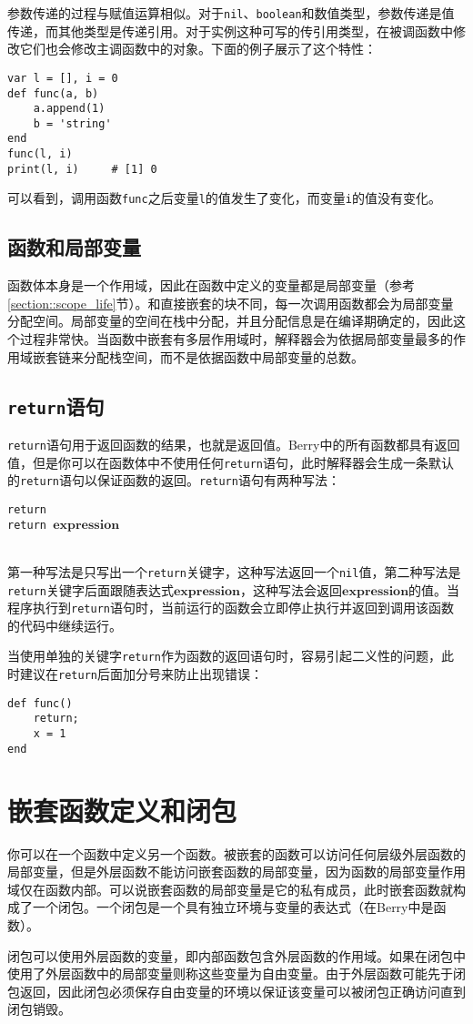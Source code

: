 参数传递的过程与赋值运算相似。对于\texttt{nil}、\texttt{boolean}和数值类型，参数传递是值传递，而其他类型是传递引用。对于实例这种可写的传引用类型，在被调函数中修改它们也会修改主调函数中的对象。下面的例子展示了这个特性：
\begin{lstlisting}[language=berry]
var l = [], i = 0
def func(a, b)
    a.append(1)
    b = 'string'
end
func(l, i)
print(l, i)     # [1] 0
\end{lstlisting}
可以看到，调用函数\texttt{func}之后变量\texttt{l}的值发生了变化，而变量\texttt{i}的值没有变化。

\subsection{函数和局部变量}

函数体本身是一个作用域，因此在函数中定义的变量都是局部变量（参考\ref{section::scope_life}节）。和直接嵌套的块不同，每一次调用函数都会为局部变量分配空间。局部变量的空间在栈中分配，并且分配信息是在编译期确定的，因此这个过程非常快。当函数中嵌套有多层作用域时，解释器会为依据局部变量最多的作用域嵌套链来分配栈空间，而不是依据函数中局部变量的总数。

\subsection{\texttt{return}语句}

\texttt{return}语句用于返回函数的结果，也就是返回值。Berry中的所有函数都具有返回值，但是你可以在函数体中不使用任何\texttt{return}语句，此时解释器会生成一条默认的\texttt{return}语句以保证函数的返回。\texttt{return}语句有两种写法：
\begin{algorithm}
    \texttt{return} \\
    \texttt{return }$\bm{expression}$
\end{algorithm}\vspace{-0.6em}\\
第一种写法是只写出一个\texttt{return}关键字，这种写法返回一个\texttt{nil}值，第二种写法是\texttt{return}关键字后面跟随表达式$\bm{expression}$，这种写法会返回$\bm{expression}$的值。当程序执行到\texttt{return}语句时，当前运行的函数会立即停止执行并返回到调用该函数的代码中继续运行。

当使用单独的关键字\texttt{return}作为函数的返回语句时，容易引起二义性的问题，此时建议在\texttt{return}后面加分号来防止出现错误：
\begin{lstlisting}[language=berry, numbers=none]
def func()
    return;
    x = 1
end
\end{lstlisting}

\section{嵌套函数定义和闭包}

你可以在一个函数中定义另一个函数。被嵌套的函数可以访问任何层级外层函数的局部变量，但是外层函数不能访问嵌套函数的局部变量，因为函数的局部变量作用域仅在函数内部。可以说嵌套函数的局部变量是它的私有成员，此时嵌套函数就构成了一个闭包。一个闭包是一个具有独立环境与变量的表达式（在Berry中是函数）。

闭包可以使用外层函数的变量，即内部函数包含外层函数的作用域。如果在闭包中使用了外层函数中的局部变量则称这些变量为自由变量。由于外层函数可能先于闭包返回，因此闭包必须保存自由变量的环境以保证该变量可以被闭包正确访问直到闭包销毁。

